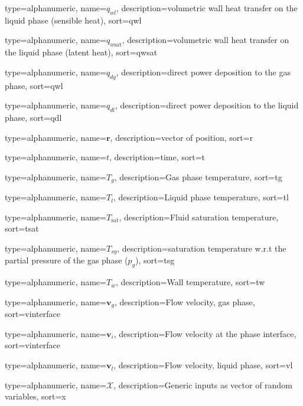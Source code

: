 {
  type=alphanumeric,
	name={\ensuremath{q_{wl}}},
	description={volumetric wall heat transfer on the liquid phase (sensible heat)},
	sort={qwl}
}

{
  type=alphanumeric,
	name={\ensuremath{q_{w\text{sat}}}},
	description={volumetric wall heat transfer on the liquid phase (latent heat)},
	sort={qwsat}
}

{
  type=alphanumeric,
	name={\ensuremath{q_{dg}}},
	description={direct power deposition to the gas phase},
	sort={qwl}
}

{
  type=alphanumeric,
	name={\ensuremath{q_{dl}}},
	description={direct power deposition to the liquid phase},
	sort={qdl}
}

{
  type=alphanumeric,
	name={\ensuremath{\mathbf{r}}},
	description={vector of position},
	sort={r}
}

{
  type=alphanumeric,
	name={\ensuremath{t}},
	description={time},
	sort={t}
}

{
  type=alphanumeric,
	name={\ensuremath{T_{g}}},
	description={Gas phase temperature},
	sort={tg}
}

{
  type=alphanumeric,
	name={\ensuremath{T_{l}}},
	description={Liquid phase temperature},
	sort={tl}
}

{
  type=alphanumeric,
	name={\ensuremath{T_{\text{sat}}}},
	description={Fluid saturation temperature},
	sort={tsat}
}

{
  type=alphanumeric,
	name={\ensuremath{T_{sg}}},
	description={saturation temperature w.r.t the partial pressure of the gas phase ($p_g$)},
	sort={tsg}
}

{
  type=alphanumeric,
	name={\ensuremath{T_{w}}},
	description={Wall temperature},
	sort={tw}
}

{
  type=alphanumeric,
	name={\ensuremath{\mathbf{v}_g}},
	description={Flow velocity, gas phase},
	sort={vinterface}
}	

{
  type=alphanumeric,
	name={\ensuremath{\mathbf{v}_i}},
	description={Flow velocity at the phase interface},
	sort={vinterface}
}	

{
  type=alphanumeric,
	name={\ensuremath{\mathbf{v}_l}},
	description={Flow velocity, liquid phase},
	sort={vl}
}	

{
  type=alphanumeric,
	name={\ensuremath{\bm{\mathcal{X}}}},
	description={Generic inputs as vector of random variables},
	sort={x}
}	

